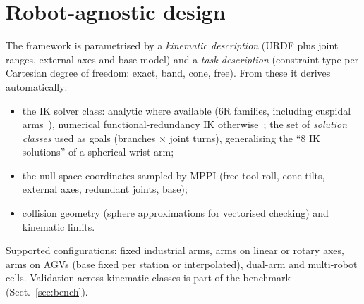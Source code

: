 \documentclass[10pt,a4paper]{article}
\begin{document}
\section{Robot-agnostic design}\label{sec:agnostic}
The framework is parametrised by a \emph{kinematic description} (URDF plus joint ranges, external axes and base model) and a \emph{task description} (constraint type per Cartesian degree of freedom: exact, band, cone, free). From these it derives automatically:
\begin{itemize}
\item the IK solver class: analytic where available (6R families, including cuspidal arms~\cite{elias2025cuspidal}), numerical functional-redundancy IK otherwise~\cite{razjigaev2025functional}; the set of \emph{solution classes} used as goals (branches $\times$ joint turns), generalising the ``8 IK solutions'' of a spherical-wrist arm;
\item the null-space coordinates sampled by MPPI (free tool roll, cone tilts, external axes, redundant joints, base);
\item collision geometry (sphere approximations for vectorised checking) and kinematic limits.
\end{itemize}
Supported configurations: fixed industrial arms, arms on linear or rotary axes, arms on AGVs (base fixed per station or interpolated), dual-arm and multi-robot cells. Validation across kinematic classes is part of the benchmark (Sect.~\ref{sec:bench}).

\end{document}
